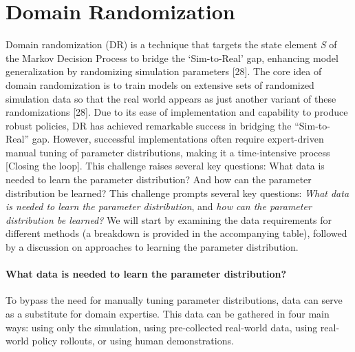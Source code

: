 
\section{Domain Randomization}
Domain randomization (DR) is a technique that targets the state element \textit{S} of the Markov Decision Process to bridge the ‘Sim-to-Real’ gap, enhancing model generalization by randomizing simulation parameters [28]. The core idea of domain randomization is to train models on extensive sets of randomized simulation data so that the real world appears as just another variant of these randomizations [28]. Due to its ease of implementation and capability to produce robust policies, DR has achieved remarkable success in bridging the “Sim-to-Real” gap. However, successful implementations often require expert-driven manual tuning of parameter distributions, making it a time-intensive process [Closing the loop]. This challenge raises several key questions: What data is needed to learn the parameter distribution? And how can the parameter distribution be learned? This challenge prompts several key questions: \textit{What data is needed to learn the parameter distribution}, and \textit{how can the parameter distribution be learned?} We will start by examining the data requirements for different methods (a breakdown is provided in the accompanying table), followed by a discussion on approaches to learning the parameter distribution.

\paragraph{What data is needed to learn the parameter distribution?}
To bypass the need for manually tuning parameter distributions, data can serve as a substitute for domain expertise. This data can be gathered in four main ways: using only the simulation, using pre-collected real-world data, using real-world policy rollouts, or using human demonstrations.

